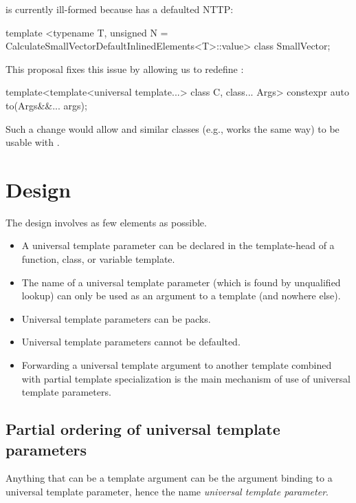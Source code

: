 \documentclass{wg21}
\begin{document}
is currently ill-formed because  has a defaulted NTTP:

\begin{colorblock}
template <typename T, unsigned N = CalculateSmallVectorDefaultInlinedElements<T>::value>
class SmallVector;
\end{colorblock}

This proposal fixes this issue by allowing us to redefine :

\begin{colorblock}
template<template<universal template...> class C, class... Args>
constexpr auto to(Args&&... args);
\end{colorblock}

Such a change would allow  and similar classes (e.g.,  works the same way) to be usable with .

\section{Design}

The design involves as few elements as possible.

\begin{itemize}
\item A universal template parameter can be declared in the template-head of a function, class, or variable template.
\item The name of a universal template parameter (which is found by unqualified lookup) can only be used as an argument to a template (and nowhere else).
\item Universal template parameters can be packs.
\item Universal template parameters cannot be defaulted.
\item Forwarding a universal template argument to another template combined with partial template specialization is the main mechanism of use of universal template parameters.
\end{itemize}

\subsection{Partial ordering of universal template parameters}

Anything that can be a template argument can be the argument binding to a universal template parameter, hence the name \emph{universal template parameter}.
\end{document}
